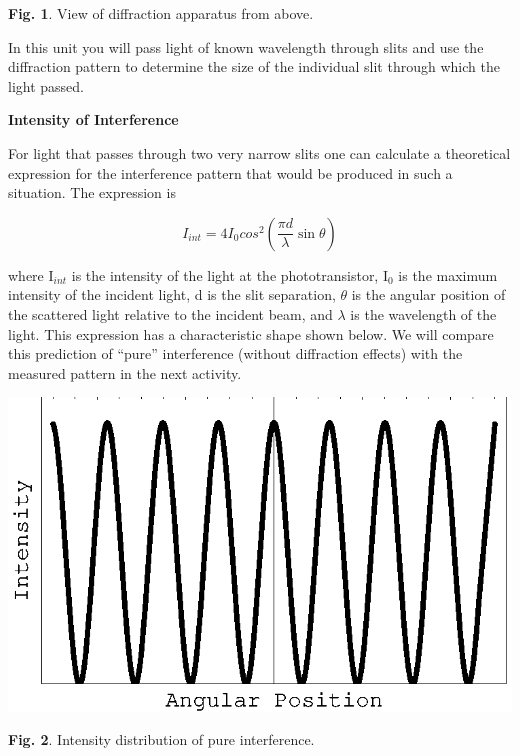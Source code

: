 {\centering \textbf{Fig. 1}. View of diffraction apparatus from above.\par}

In this unit you will  pass light of known wavelength through slits 
and use the diffraction pattern to determine the size of the individual
slit through which the light passed.

\textbf{Intensity of Interference }

For light that passes through two very narrow slits one can calculate
a theoretical expression for the interference pattern that would be
produced in such a situation. The expression is 

\begin{displaymath} I_{int} = 4I_0 cos^2 (\frac {\pi d} {\lambda} \sin \theta ) \end{displaymath}

where I\( _{int} \) is the intensity of the light at the phototransistor,
I\( _{0} \) is the maximum intensity of the incident light, d is
the slit separation, \( \theta  \) is the angular position of the
scattered light relative to the incident beam, and \( \lambda  \)
is the wavelength of the light. This expression has a characteristic
shape shown below. We will compare this prediction of {}``pure''
interference (without diffraction effects) with the measured pattern
in the next activity.

\vspace{0.3cm}
{\centering \includegraphics{diffraction_of_light_fig_2.eps} \par}
\vspace{0.3cm}

{\centering \textbf{Fig. 2}. Intensity distribution of pure interference.\par}


